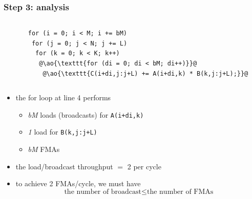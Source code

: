 \documentclass[12pt,dvipdfmx]{beamer}
\newcommand{\ao}[1]{{\color{blue}#1}}
\begin{document}
\begin{frame}[fragile]
  \frametitle{Step 3: analysis}
  \begin{columns}
    \begin{column}{0.35\textwidth}
\begin{center}
\def\svgwidth{0.9\textwidth}
{\scriptsize }%
\end{center}
    \end{column}
    \begin{column}{0.58\textwidth}
\begin{lstlisting}
for (i = 0; i < M; i += bM)
 for (j = 0; j < N; j += L)  
  for (k = 0; k < K; k++)  
   @\ao{\texttt{for (di = 0; di < bM; di++)}}@
    @\ao{\texttt{C(i+di,j:j+L) += A(i+di,k) * B(k,j:j+L);}}@
\end{lstlisting}
    \end{column}
  \end{columns}

\begin{itemize}
\item the for loop at line 4 performs
  \begin{itemize}
  \item \ao{\it bM} loads (broadcasts) for {\tt A(i+di,k)}
  \item \ao{\it 1} load for {\tt B(k,j:j+L)}
  \item \ao{\it bM} FMAs
  \end{itemize}
\item the load/broadcast throughput $=$ 2 per cycle
\item to achieve 2 FMAs/cycle, we must have
  \[ \mbox{the number of broadcast} \leq \mbox{the number of FMAs} \]
\end{itemize}
\end{frame}
\end{document}
